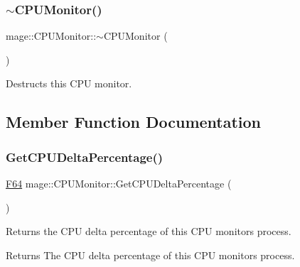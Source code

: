 \subsubsection{\texorpdfstring{$\sim$\+C\+P\+U\+Monitor()}{~CPUMonitor()}}
{\footnotesize\ttfamily mage\+::\+C\+P\+U\+Monitor\+::$\sim$\+C\+P\+U\+Monitor (\begin{DoxyParamCaption}{ }\end{DoxyParamCaption})\hspace{0.3cm}{\ttfamily [default]}}

Destructs this C\+PU monitor. 

\subsection{Member Function Documentation}
\mbox{\label{classmage_1_1_c_p_u_monitor_a9f40f0907535869e767f8eca6a03caa5}} 
\subsubsection{\texorpdfstring{Get\+C\+P\+U\+Delta\+Percentage()}{GetCPUDeltaPercentage()}}
{\footnotesize\ttfamily \mbox{\hyperlink{namespacemage_ad26233bbec640deda836e572c1a23708}{F64}} mage\+::\+C\+P\+U\+Monitor\+::\+Get\+C\+P\+U\+Delta\+Percentage (\begin{DoxyParamCaption}{ }\end{DoxyParamCaption})\hspace{0.3cm}{\ttfamily [noexcept]}}

Returns the C\+PU delta percentage of this C\+PU monitor\textquotesingle{}s process.

\begin{DoxyReturn}{Returns}
The C\+PU delta percentage of this C\+PU monitor\textquotesingle{}s process. 
\end{DoxyReturn}
\mbox{\label{classmage_1_1_c_p_u_monitor_a7b711a492b936c01219876528d770cbc}} 

